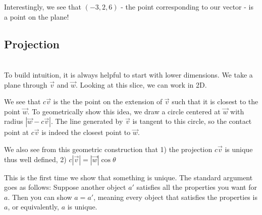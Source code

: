 Interestingly, we see that $(-3,2,6)$ - the point corresponding to our vector - is a point on the plane!

\subsection{Projection}
\ \\

To build intuition, it is always helpful to start with lower dimensions. We take a plane through $\vec{v}$ and $\vec{w}$. Looking at this slice, we can work in 2D.

	
	

We see that $c\vec{v}$ is the the point on the extension of $\vec{v}$ such that it is closest to the point $\vec{w}$. To geometrically show this idea, we draw a circle centered at $\vec{w}$ with radius $|\vec{w}-c\vec{v}|$. The line generated by $\vec{v}$ is tangent to this circle, so the contact point at $c\vec{v}$ is indeed the closest point to $\vec{w}$. 

We also see from this geometric construction that 1) the projection $c\vec{v}$ is unique thus well defined, 2) $c|\vec{v}|=|\vec{w}|\cos \theta$

This is the first time we show that something is unique. The standard argument goes as follows: Suppose another object $a'$ satisfies all the properties you want for $a$. Then you can show $a=a'$, meaning every object that satisfies the properties is $a$, or equivalently, $a$ is unique. 

